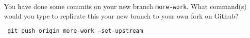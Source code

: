 \documentclass[10pt]{examdesign}
\begin{document}
\begin{shortanswer}[title={Short Answer},
                    rearrange=no,resetcounter=no]
\begin{block}[questions=1]
\begin{question}

    You have done some commits on your new branch \texttt{more-work}.  What
    command(s) would you type to replicate this your new branch to your own
    fork on Github?

    \vspace{80mm}
    \begin{answer}
        \texttt{
            git push origin more-work --set-upstream
        }
    \end{answer}

\end{question}

\end{block}

\end{shortanswer}
\end{document}
